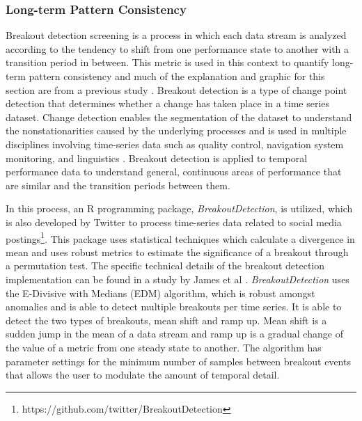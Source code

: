 \subsubsection{Long-term Pattern Consistency}
\label{sec:patternconsistency}

Breakout detection screening is a process in which each data stream is analyzed according to the tendency to shift from one performance state to another with a transition period in between. This metric is used in this context to quantify long-term pattern consistency and much of the explanation and graphic for this section are from a previous study \cite{miller_forensically_2015}. Breakout detection is a type of change point detection that determines whether a change has taken place in a time series dataset. Change detection enables the segmentation of the dataset to understand the nonstationarities caused by the underlying processes and is used in multiple disciplines involving time-series data such as quality control, navigation system monitoring, and linguistics \cite{basseville_detection_1993}. Breakout detection is applied to temporal performance data to understand general, continuous areas of performance that are similar and the transition periods between them.

In this process, an R programming package, \emph{BreakoutDetection}, is utilized, which is also developed by Twitter to process time-series data related to social media postings\footnote{https://github.com/twitter/BreakoutDetection}. This package uses statistical techniques which calculate a divergence in mean and uses robust metrics to estimate the significance of a breakout through a permutation test. The specific technical details of the breakout detection implementation can be found in a study by James et al \cite{james2014leveraging}. \emph{BreakoutDetection} uses the E-Divisive with Medians (EDM) algorithm, which is robust amongst anomalies and is able to detect multiple breakouts per time series. It is able to detect the two types of breakouts, mean shift and ramp up. Mean shift is a sudden jump in the mean of a data stream and ramp up is a gradual change of the value of a metric from one steady state to another. The algorithm has parameter settings for the minimum number of samples between breakout events that allows the user to modulate the amount of temporal detail.

